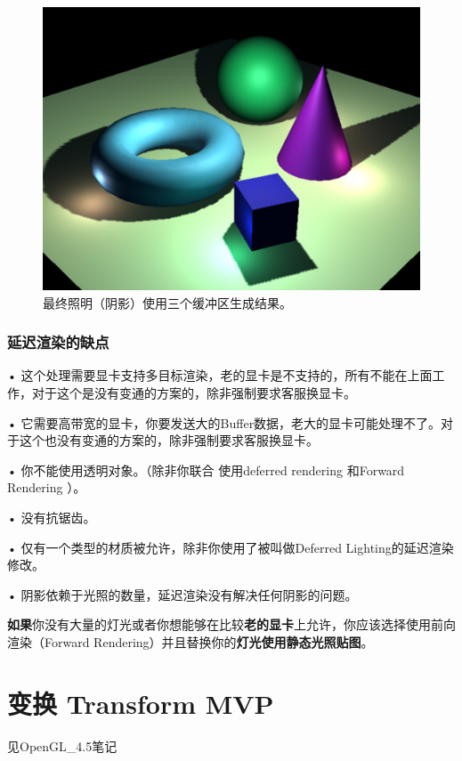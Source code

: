 \documentclass[UTF8,a4paper,12pt]{ctexbook}
\begin{document}
			\begin{figure}[H]
				\centering
				\includegraphics[width=\linewidth]{Defferred03}
				\caption{最终照明（阴影）使用三个缓冲区生成结果。}
			\end{figure}			
		
		
		\subsection{延迟渲染的缺点}
			• 这个处理需要显卡支持多目标渲染，老的显卡是不支持的，所有不能在上面工作，对于这个是没有变通的方案的，除非强制要求客服换显卡。
			
			• 它需要高带宽的显卡，你要发送大的Buffer数据，老大的显卡可能处理不了。对于这个也没有变通的方案的，除非强制要求客服换显卡。
			
			• 你不能使用透明对象。（除非你联合 使用deferred rendering 和Forward Rendering ）。
			
			• 没有抗锯齿。
			
			• 仅有一个类型的材质被允许，除非你使用了被叫做Deferred Lighting的延迟渲染修改。
			
			• 阴影依赖于光照的数量，延迟渲染没有解决任何阴影的问题。	
			
		
			\textbf{如果}你没有大量的灯光或者你想能够在比较\textbf{老的显卡}上允许，你应该选择使用前向渲染（Forward Rendering）并且替换你的\textbf{灯光使用静态光照贴图}。
		
		
\chapter{变换 Transform MVP}
	见OpenGL\_4.5笔记
\end{document}
